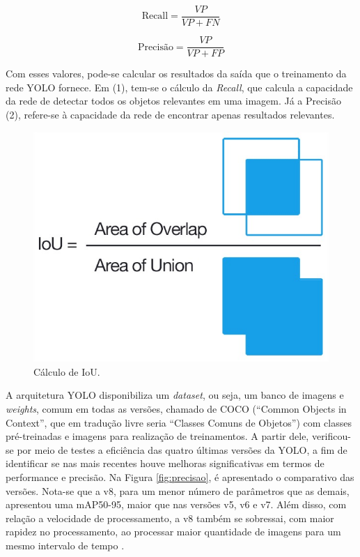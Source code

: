 \begin{equation}
    \text{Recall} = \frac{VP}{VP + FN} \tag{1}
\end{equation}
    
\begin{equation}
    \text{Precisão} = \frac{VP}{VP + FP} \tag{2}
\end{equation}

Com esses valores, pode-se calcular os resultados da saída que o treinamento da rede YOLO fornece. Em (1), tem-se o cálculo da \textit{Recall}, que calcula a capacidade da rede de detectar todos os objetos relevantes em uma imagem. Já a Precisão (2), refere-se à capacidade da rede de encontrar apenas resultados relevantes. 

\begin{figure}[!h]
    \center
    \begin{minipage}{0.6\linewidth}
    \center
    \captionsetup{justification=centering,margin=0.5cm,font=small}
    \includegraphics[width=0.7\linewidth]{img/cap2/iou.png}
    \caption{ Cálculo de IoU. \cite{padilla2020survey}}
    \label{fig:iou}
    \end{minipage}
\end{figure}

A arquitetura YOLO disponibiliza um \textit{dataset}, ou seja, um banco de imagens e \textit{weights}, comum em todas as versões, chamado de COCO (“Common Objects in Context”, que em tradução livre seria “Classes Comuns de Objetos”) com classes pré-treinadas e imagens para realização de treinamentos. A partir dele, verificou-se por meio de testes a eficiência das quatro últimas versões da YOLO, a fim de identificar se nas mais recentes houve melhoras significativas em termos de performance e precisão. Na Figura \ref{fig:precisao}, é apresentado o comparativo das versões. Nota-se que a v8, para um menor número de parâmetros que as demais, apresentou uma mAP50-95, maior que nas versões v5, v6 e v7. Além disso, com relação a velocidade de processamento, a v8 também se sobressai, com maior rapidez no processamento, ao processar maior quantidade de imagens para um mesmo intervalo de tempo \cite{padilla2020survey}.

